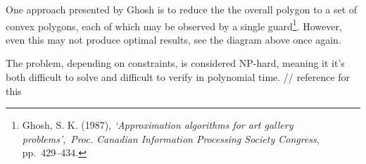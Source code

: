 \documentclass[
]{article}
\begin{document}
One approach presented by Ghosh is to reduce the the overall polygon to
a set of convex polygons, each of which may be observed by a single
guard\footnote{Ghosh, S. K. (1987), \emph{`Approximation algorithms for
  art gallery problems'},~\emph{Proc. Canadian Information Processing
  Society Congress}, pp.~429--434.}. However, even this may not produce
optimal results, see the diagram above once again.

The problem, depending on constraints, is considered NP-hard, meaning it
it's both difficult to solve and difficult to verify in polynomial time.
// reference for this
\end{document}
